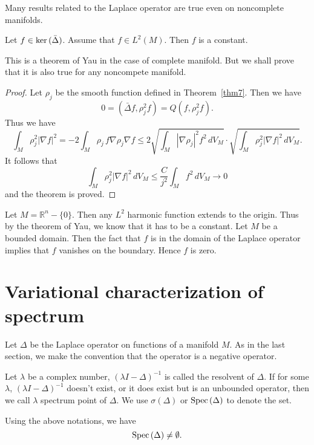 Many results related to the Laplace operator are true even on noncomplete manifolds. 

\begin{theorem}
Let $f\in {\rm ker}\,(\bar\Delta)$. Assume that $f\in L^2(M)$. Then $f$ is a constant. 
\end{theorem}

This is a theorem of Yau in the case of complete manifold. But we shall prove that it is also true for any noncompete manifold.


\begin{proof}
Let $\rho_j$ be the smooth function defined in Theorem~\ref{thm7}. Then we have
\[
0=(\bar\Delta f, \rho_j^2 f)=Q(f,\rho_j^2 f).
\]
Thus we have
\[
\int_M\rho_j^2|\nabla f|^2=-2\int_M \rho_j\, f\nabla\rho_j\nabla f\leq 2\sqrt{\int_M|\nabla \rho_j|^2 f^2\, dV_M}
\cdot\sqrt{\int_M\rho_j^2|\nabla f|^2\, dV_M}.
\]
It follows that 
\[
\int_M\rho_j^2|\nabla f|^2\,dV_M\leq \frac{C}{j^2}\int_Mf^2\, dV_M\to 0
\]
and the theorem is proved. 


\end{proof}

\begin{example}
Let $M=\mathbb R^n-\{0\}$. Then any $L^2$ harmonic function extends to the origin. Thus by the theorem of Yau, we know that it has to be a constant. Let $M$ be a bounded domain. Then the fact that $f$ is in the domain of the Laplace operator implies that $f$ vanishes on the boundary. Hence $f$ is zero.
\end{example}


\section{Variational characterization of spectrum}\label{Var_principle}
Let $\Delta$ be the Laplace operator on functions of a manifold $M$. As in the last section, we make the convention that the operator is a negative operator.

Let $\lambda$ be a complex number, $(\lambda I-\Delta)^{-1}$ is called the resolvent of $\Delta$. If for some $\lambda$, $(\lambda I-\Delta)^{-1}$ doesn't exist, or it does exist but is an unbounded operator, then we call $\lambda$  spectrum point of $\Delta$. We use $\sigma(\Delta)$ or ${\rm Spec}\, (\Delta)$ to denote the set.

\begin{theorem} Using the above notations, we have
\[
{\rm Spec} \,(\Delta)\neq\emptyset.
\]
\end{theorem}

